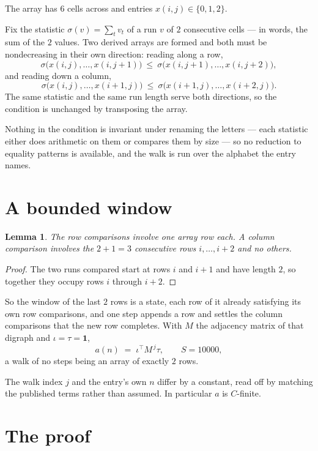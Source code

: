 \documentclass[11pt,a4paper]{article}
\theoremstyle{plain}
\newtheorem{lemma}[theorem]{Lemma}
\theoremstyle{definition}
\begin{document}
The array has $6$ cells across and entries $x(i,j)\in\{0,1,2\}$.

Fix the statistic $\sigma(v)=\sum_{t} v_t$ of a run $v$ of $2$ consecutive cells --- in words,
the sum of the $2$ values. Two derived arrays are formed and both must be
nondecreasing in their own direction: reading along a row,
\[
\sigma\bigl(x(i,j),\dots,x(i,j{+}1)\bigr)\ \le\
\sigma\bigl(x(i,j{+}1),\dots,x(i,j{+}2)\bigr),
\]
and reading down a column,
\[
\sigma\bigl(x(i,j),\dots,x(i{+}1,j)\bigr)\ \le\
\sigma\bigl(x(i{+}1,j),\dots,x(i{+}2,j)\bigr).
\]
The same statistic and the same run length serve both directions, so the condition is
unchanged by transposing the array.

Nothing in the condition is invariant under renaming the letters --- each statistic either does
arithmetic on them or compares them by size --- so no reduction to equality patterns is
available, and the walk is run over the alphabet the entry names.

\section{A bounded window}

\begin{lemma}\label{lem:win}
The row comparisons involve one array row each. A column comparison involves the
$2+1=3$ consecutive rows $i,\dots,i{+}2$ and no others.
\end{lemma}

\begin{proof}
The two runs compared start at rows $i$ and $i+1$ and have length $2$, so together they
occupy rows $i$ through $i+2$.
\end{proof}

So the window of the last $2$ rows is a state, each row of it already satisfying its own row
comparisons, and one step appends a row and settles the column comparisons that the new row
completes. With $M$ the adjacency matrix of that digraph and $\iota=\tau=\mathbf{1}$,
\[
a(n)\;=\;\iota^{\!\top}M^{\,j}\tau ,\qquad S=10000,
\]
a walk of no steps being an array of exactly $2$ rows.

The walk index $j$ and the entry's own $n$ differ by a constant, read off by matching the
published terms rather than assumed. In particular $a$ is $C$-finite.

\section{The proof}
\end{document}
